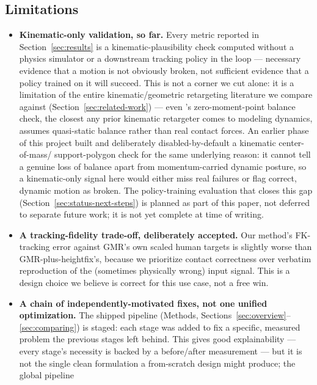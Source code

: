 \subsection{Limitations}
\label{sec:limitations}

\begin{itemize}
  \item \textbf{Kinematic-only validation, so far.} Every metric reported
    in Section~\ref{sec:results} is a kinematic-plausibility check computed
    without a physics simulator or a downstream tracking policy in the
    loop --- necessary evidence that a motion is not obviously broken, not
    sufficient evidence that a policy trained on it will succeed. This is
    not a corner we cut alone: it is a limitation of the entire
    kinematic/geometric retargeting literature we compare against
    (Section~\ref{sec:related-work}) --- even \cite{ayusawa2017morphing}'s
    zero-moment-point balance check, the closest any prior kinematic
    retargeter comes to modeling dynamics, assumes quasi-static balance
    rather than real contact forces. An earlier phase of this project
    built and deliberately disabled-by-default a kinematic center-of-mass/
    support-polygon check for the same underlying reason: it cannot tell a
    genuine loss of balance apart from momentum-carried dynamic posture, so
    a kinematic-only signal here would either miss real failures or flag
    correct, dynamic motion as broken. The policy-training evaluation that
    closes this gap (Section~\ref{sec:status-next-steps}) is planned as
    part of this paper, not deferred to separate future work; it is not
    yet complete at time of writing.
  \item \textbf{A tracking-fidelity trade-off, deliberately accepted.} Our
    method's FK-tracking error against GMR's own scaled human targets is
    slightly worse than GMR-plus-heightfix's, because we prioritize contact
    correctness over verbatim reproduction of the (sometimes physically
    wrong) input signal. This is a design choice we believe is correct for
    this use case, not a free win.
  \item \textbf{A chain of independently-motivated fixes, not one unified
    optimization.} The shipped pipeline (Methods,
    Sections~\ref{sec:overview}--\ref{sec:comparing}) is staged: each stage
    was added to fix a specific, measured problem the previous stages left
    behind. This gives good explainability --- every stage's necessity is
    backed by a before/after measurement --- but it is not the single clean
    formulation a from-scratch design might produce; the global pipeline

\end{itemize}
